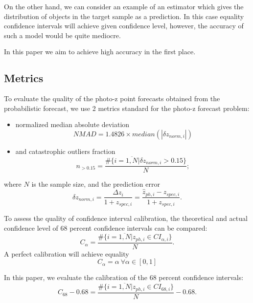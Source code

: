 \documentclass[fleqn,usenatbib]{mnras}
\begin{document}
On the other hand, we can consider an example of an estimator which gives the distribution of objects in the target sample as a prediction. In this case equality confidence intervals will achieve given confidence level, however, the accuracy of such a model would be quite mediocre.

In this paper we aim to achieve high accuracy in the first place.

\subsection{Metrics}

To evaluate the quality of the photo-z point forecasts obtained from the probabilistic forecast, we use 2 metrics standard for the photo-z forecast problem:
\begin{itemize}
    \item normalized median absolute deviation \begin{equation}\label{eq:nmad}
        NMAD = 1.4826 \times median(|\delta z_{norm,i}|)
    \end{equation}
    \item and catastrophic outliers fraction \begin{equation}\label{eq:n015}
        n_{>0.15} = \frac{\#\{i = \overline{1, N} | \delta z_{norm, i} > 0.15\}}{N};
    \end{equation}
\end{itemize}
where \(N\) is the sample size, and the prediction error \begin{equation}\label{eq:dznorm}
    \delta z_{norm,i} = \frac{\Delta z_i}{1+z_{spec,i}} = \frac{\hat{z}_{ph,i} - z_{spec,i}}{1+z_{spec,i}}.
\end{equation}

To assess the quality of confidence interval calibration, the theoretical and actual confidence level of 68 percent confidence intervals can be compared:
\begin{equation}\label{eq:calpha}
    C_{\alpha} = \frac{\#\{i = \overline{1, N} | z_{ph,i} \in CI_{\alpha, i}\}}{N}.
\end{equation}
A perfect calibration will achieve equality
\begin{equation}\label{eq:perfect-ci}
    C_{\alpha} = \alpha ~ \forall \alpha \in [0, 1]
\end{equation}

In this paper, we evaluate the calibration of the 68 percent confidence intervals:
\begin{equation}\label{eq:c68}
    C_{68} - 0.68 = \frac{\#\{i = \overline{1, N} | z_{ph,i} \in CI_{68, i}\}}{N} - 0.68.
\end{equation}
\end{document}
